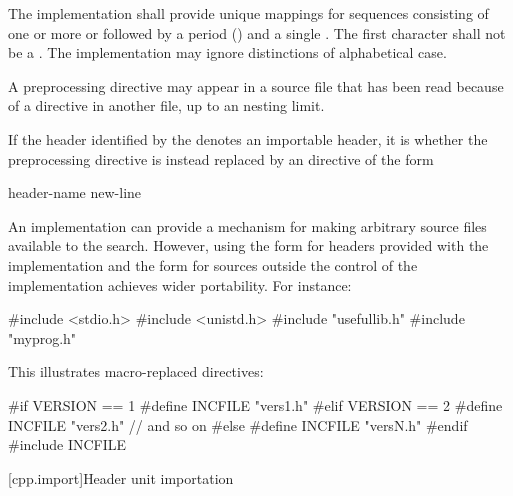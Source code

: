 \pnum
The implementation shall provide unique mappings for
sequences consisting of one or more
 or 
followed by a period
()
and a single
.
The first character shall not be a .
The implementation may ignore distinctions of alphabetical case.

\pnum
A
preprocessing directive may appear
in a source file that has been read because of a
directive in another file,
up to an  nesting limit.

\pnum
If the header identified by the 
denotes an importable header,
it is
whether the  preprocessing directive
is instead replaced by an  directive of the form
\begin{ncbnf}
 header-name \terminal{;} new-line
\end{ncbnf}

\pnum
\begin{note}
An implementation can provide a mechanism for making arbitrary
source files available to the \tcode{< >} search.
However, using the \tcode{< >} form for headers provided
with the implementation and the  form for sources
outside the control of the implementation
achieves wider portability. For instance:

\begin{codeblock}
#include <stdio.h>
#include <unistd.h>
#include "usefullib.h"
#include "myprog.h"
\end{codeblock}

\end{note}

\pnum
\begin{example}
This illustrates macro-replaced
directives:

\begin{codeblock}
#if VERSION == 1
    #define INCFILE  "vers1.h"
#elif VERSION == 2
    #define INCFILE  "vers2.h"  // and so on
#else
    #define INCFILE  "versN.h"
#endif
#include INCFILE
\end{codeblock}
\end{example}

[cpp.import]{Header unit importation}
%
%
%

